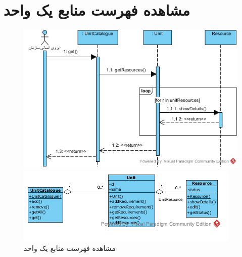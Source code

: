 \section{مشاهده فهرست منابع یک واحد}
\begin{figure}[H]
	\centering
	\includegraphics[scale=1]{img/sequence-analysis/ViewListOfResources}
	
	
	\includegraphics[scale=1]{img/sequence-analysis/ViewListOfResourcesC}
	\caption{مشاهده فهرست منابع یک واحد}
\end{figure}

